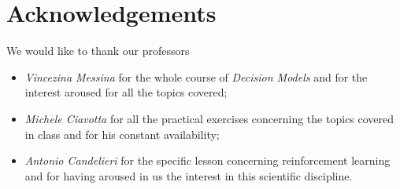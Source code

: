 \documentclass[10pt]{article}
\begin{document}

%
%
\newpage
\section*{Acknowledgements}
We would like to thank our professors 
\begin{itemize}
\item \textit{Vincezina Messina} for the whole course of \textit{Decision Models} and for the interest aroused for all the topics covered;
\item \textit{Michele Ciavotta} for all the practical exercises concerning the topics covered in class and for his constant availability;
\item \textit{Antonio Candelieri} for the specific lesson concerning reinforcement learning and for having aroused in us the interest in this scientific discipline.
\end{itemize}
\end{document}
